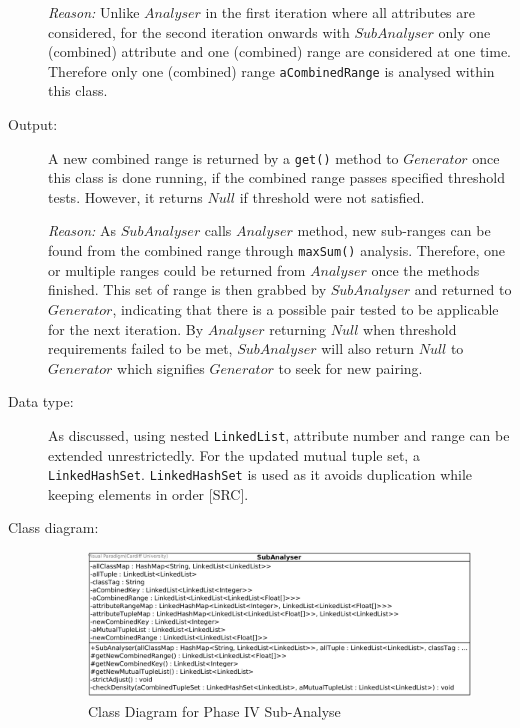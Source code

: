 \begin{description}
\textit{Reason: } Unlike $Analyser$ in the first iteration where all attributes are considered, for the second iteration onwards with $SubAnalyser$ only one (combined) attribute and one (combined) range are considered at one time. Therefore only one (combined) range \texttt{aCombinedRange} is analysed within this class.

\item[Output: ] A new combined range is returned by a \texttt{get()} method to $Generator$ once this class is done running, if the combined range passes specified threshold tests. However, it returns $Null$ if threshold were not satisfied.
  
\textit{Reason: } As $SubAnalyser$ calls $Analyser$ method, new sub-ranges can be found from the combined range through \texttt{maxSum()} analysis. Therefore, one or multiple ranges could be returned from $Analyser$ once the methods finished. This set of range is then grabbed by $SubAnalyser$ and returned to $Generator$, indicating that there is a possible pair tested to be applicable for the next iteration. By $Analyser$ returning $Null$ when threshold requirements failed to be met, $SubAnalyser$ will also return $Null$ to $Generator$ which signifies $Generator$ to seek for new pairing.

\item[Data type: ] As discussed, using nested \texttt{LinkedList}, attribute number and range can be extended unrestrictedly. For the updated mutual tuple set, a \texttt{LinkedHashSet}. \texttt{LinkedHashSet} is used as it avoids duplication while keeping elements in order [SRC]. 

\item[Class diagram: ] 

\begin{figure}[!htbp]
    \centering
    \includegraphics[width=5.5in]{figures/class_subanalyser}
    \caption[Class Diagram for Phase IV Sub-Analyse]{Class Diagram for Phase IV Sub-Analyse}
    \label{fig:figure4_5}
\end{figure}


\end{description}

